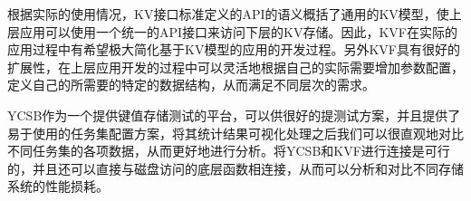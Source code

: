 
	根据实际的使用情况，KV接口标准定义的API的语义概括了通用的KV模型，使上层应用可以使用一个统一的API接口来访问下层的KV存储。因此，KVF在实际的应用过程中有希望极大简化基于KV模型的应用的开发过程。另外KVF具有很好的扩展性，在上层应用开发的过程中可以灵活地根据自己的实际需要增加参数配置，定义自己的所需要的特定的数据结构，从而满足不同层次的需求。

	YCSB作为一个提供键值存储测试的平台，可以供很好的提测试方案，并且提供了易于使用的任务集配置方案，将其统计结果可视化处理之后我们可以很直观地对比不同任务集的各项数据，从而更好地进行分析。将YCSB和KVF进行连接是可行的，并且还可以直接与磁盘访问的底层函数相连接，从而可以分析和对比不同存储系统的性能损耗。


